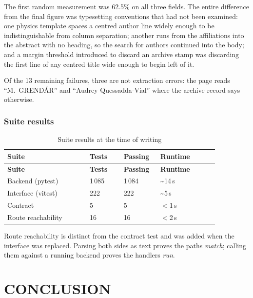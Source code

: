 \documentclass[12pt,a4paper]{report}
\begin{document}
The first random measurement was 62.5\% on all three fields. The entire
difference from the final figure was typesetting conventions that had not been
examined: one physics template spaces a centred author line widely enough to be
indistinguishable from column separation; another runs from the affiliations
into the abstract with no heading, so the search for authors continued into the
body; and a margin threshold introduced to discard an archive stamp was
discarding the first line of any centred title wide enough to begin left of it.

Of the 13 remaining failures, three are not extraction errors: the page reads
``M.~GRENDÁR'' and ``Audrey Quessadda-Vial'' where the archive record says
otherwise.

\subsection{Suite results}

\begin{longtable}{@{}p{0.34\linewidth}p{0.14\linewidth}p{0.14\linewidth}p{0.24\linewidth}@{}}
\caption{Suite results at the time of writing}\label{tab:suites}\\
\toprule
\textbf{Suite} & \textbf{Tests} & \textbf{Passing} & \textbf{Runtime} \\
\midrule
\endfirsthead
\toprule
\textbf{Suite} & \textbf{Tests} & \textbf{Passing} & \textbf{Runtime} \\
\midrule
\endhead

Backend (pytest)      & 1\,085 & 1\,084 & \textasciitilde14\,s \\
Interface (vitest)    & 222 & 222 & \textasciitilde5\,s \\
Contract              & 5   & 5   & $<$1\,s \\
Route reachability    & 16  & 16  & $<$2\,s \\
\bottomrule
\end{longtable}

Route reachability is distinct from the contract test and was added when the
interface was replaced. Parsing both sides as text proves the paths
\emph{match}; calling them against a running backend proves the handlers
\emph{run}.

\chapter{CONCLUSION}
\end{document}

